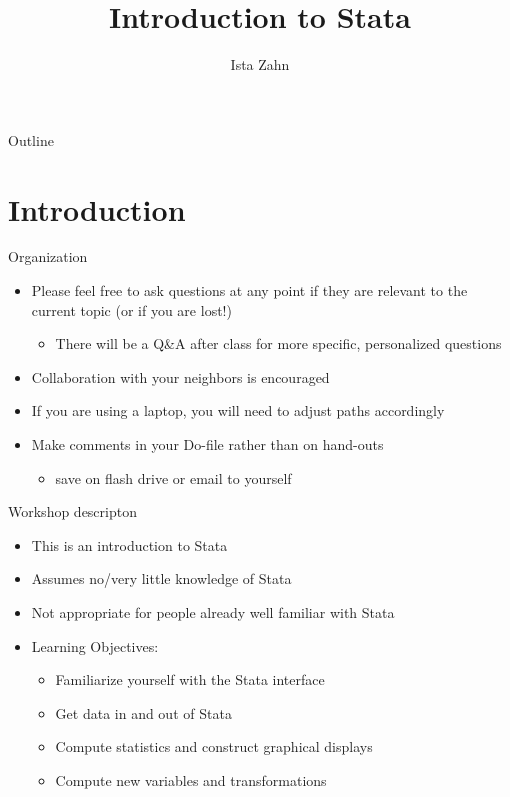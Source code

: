 \documentclass[table,smaller]{beamer}
\institute{Harvard MIT Data Center}
\author{Ista Zahn}
\date{}
\title{Introduction to Stata}
\begin{document}
\maketitle
\begin{frame}{Outline}
\tableofcontents
\end{frame}



\section{Introduction}
\label{sec-1}

\begin{frame}[label=sec-1-1]{Organization}
\begin{itemize}
\item Please feel free to ask questions at any point if they are relevant to the current topic (or if you are lost!)
\begin{itemize}
\item There will be a Q\&A after class for more specific, personalized questions
\end{itemize}
\item Collaboration with your neighbors is encouraged
\item If you are using a laptop, you will need to adjust paths accordingly
\item Make comments in your Do-file rather than on hand-outs  
\begin{itemize}
\item save on flash drive or email to yourself
\end{itemize}
\end{itemize}
\end{frame}
\begin{frame}[label=sec-1-2]{Workshop descripton}
\begin{itemize}
\item This is an \alert{introduction} to Stata
\item Assumes no/very little knowledge of Stata
\item Not appropriate for people already well familiar with Stata
\item Learning Objectives:
\begin{itemize}
\item Familiarize yourself with the Stata interface
\item Get data in and out of Stata
\item Compute statistics and construct graphical displays
\item Compute new variables and transformations
\end{itemize}
\end{itemize}
\end{frame}
\end{document}

